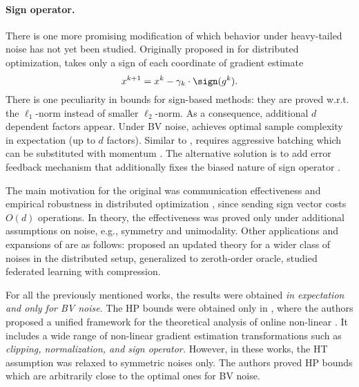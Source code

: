 \paragraph{Sign operator.} There is one more promising modification of  which behavior under heavy-tailed noise has not yet been studied. Originally proposed in \cite{bernstein2018signsgd} for distributed optimization,  takes only a sign of each coordinate of gradient estimate $$x^{k+1} = x^k - \gamma_k \cdot \sign(g^k).$$ There is one peculiarity in bounds for sign-based methods: they are proved w.r.t. the $\ell_1$-norm instead of smaller $\ell_2$-norm. As a consequence, additional $d$ dependent factors appear.  
Under BV noise,  achieves optimal sample complexity in expectation (up to $d$ factors). Similar to ,  requires aggressive batching which can be substituted with momentum \cite{sun2023momentum}. The alternative solution is to add error feedback mechanism that additionally fixes the biased nature of sign operator \cite{seide20141, karimireddy2019error}.

The main motivation for the original  was communication effectiveness and empirical robustness in distributed optimization \cite{bernstein2018majorityvote}, since sending sign vector costs $O(d)$ operations. In theory, the effectiveness was proved only under additional assumptions on noise, e.g., symmetry and unimodality. Other applications and expansions of  are as follows: 
\cite{safaryan2021stochastic} proposed an updated theory for a wider class of noises in the distributed setup, \cite{liu2019signsgd} generalized  to zeroth-order oracle, \cite{jin2020stochastic} studied federated learning with compression.

For all the previously mentioned works, the results were obtained \textit{in expectation and only for BV noise}. The HP bounds were obtained only in \cite{armacki2023high, armacki2024large}, where the authors proposed a unified framework for the theoretical analysis of online non-linear . It includes a wide range of non-linear gradient estimation transformations such as \textit{clipping, normalization, and sign operator.} However, in these works, the HT assumption was relaxed to symmetric noises only. The authors proved HP bounds which are arbitrarily close to the optimal ones for BV noise.